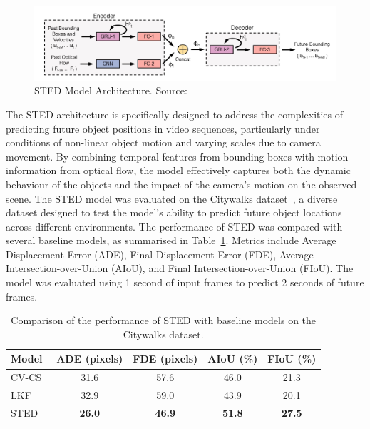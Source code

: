 \documentclass[12pt,oneside]{book} %
\begin{document}
\begin{figure}[H]
    \centering
    \includegraphics[width=1\textwidth]{figures/STED.png}
    \caption{STED Model Architecture. Source:~\citet{MultipleObjectForecasting}}\label{fig:sted}
\end{figure}

The STED architecture is specifically designed to address the complexities of
predicting future object positions in video sequences, particularly under
conditions of non-linear object motion and varying scales due to camera
movement. By combining temporal features from bounding boxes with motion
information from optical flow, the model effectively captures both the dynamic
behaviour of the objects and the impact of the camera's motion on the observed
scene. The STED model was evaluated on the Citywalks
dataset~\cite{MultipleObjectForecasting}, a diverse dataset designed to test
the model's ability to predict future object locations across different
environments. The performance of STED was compared with several baseline
models, as summarised in Table~\ref{tab:sted-results}. Metrics include Average
Displacement Error (ADE), Final Displacement Error (FDE), Average
Intersection-over-Union (AIoU), and Final Intersection-over-Union (FIoU). The
model was evaluated using 1 second of input frames to predict 2 seconds of
future frames.
\begin{table}[H]
    \centering
    \caption{Comparison of the performance of STED with baseline models on the Citywalks dataset. }
    \begin{adjustbox}{max width=\textwidth}
        \begin{tabular}{lcccc}
            \toprule
            \textbf{Model}                         & \textbf{ADE (pixels)} & \textbf{FDE (pixels)} & \textbf{AIoU (\%)} & \textbf{FIoU (\%)} \\ 
            \midrule
            CV-CS~\cite{MultipleObjectForecasting} & 31.6                  & 57.6                  & 46.0               & 21.3               \\
            LKF~\cite{MultipleObjectForecasting}   & 32.9                  & 59.0                  & 43.9               & 20.1               \\
            STED~\cite{MultipleObjectForecasting}  & \textbf{26.0}         & \textbf{46.9}         & \textbf{51.8}      & \textbf{27.5}      \\
            \bottomrule
        \end{tabular}
    \end{adjustbox}
    \label{tab:sted-results}
\end{table}
\end{document}
